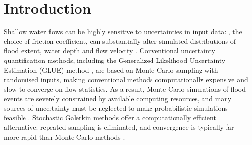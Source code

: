 \section{Introduction}
Shallow water flows can be highly sensitive to uncertainties in input data: , the choice of friction coefficient,  can substantially alter simulated distributions of flood extent, water depth and flow velocity \citep{bates2014,kim-sanders2016,jung-merwade2012,montanari-dibaldassarre2013}.
Conventional uncertainty quantification methods, including the Generalized Likelihood Uncertainty Estimation (GLUE) method \citep{beven-binley1992}, are based on Monte Carlo sampling with randomised inputs, making conventional methods computationally expensive and slow to converge on flow statistics.
As a result, Monte Carlo simulations of flood events are severely constrained by available computing resources, and many sources of uncertainty must be neglected to make probabilistic simulations feasible \citep{neal2013}.
Stochastic Galerkin methods offer a computationally efficient alternative: repeated sampling is eliminated, and convergence is typically far more rapid than Monte Carlo methods \citep{xiu2009,ge2008}.

